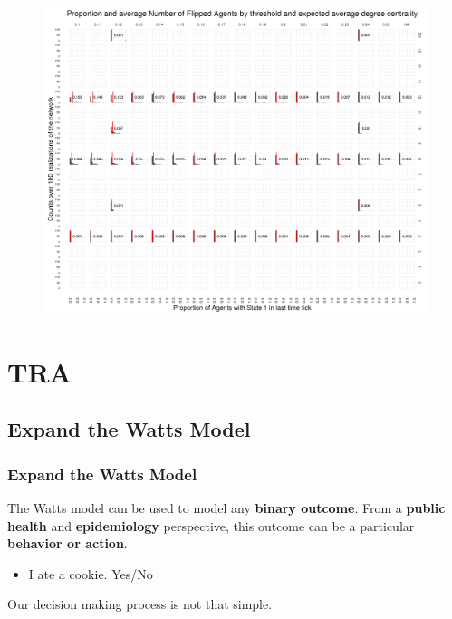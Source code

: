 \documentclass[compress]{beamer}
\begin{document}
    \begin{frame}[BlankLogo]
        \begin{figure}
            \centering
            \includegraphics[width=0.75\linewidth]{../figures/p_flipped_all}
            \caption{}
            \label{fig:pflippedall}
        \end{figure}
                    
    \end{frame}

\section{TRA}

\subsection{Expand the Watts Model}

    \begin{frame}[Basic2]\frametitle{Expand the Watts Model}
        The Watts model can be used to model any \textbf{binary outcome}.
        From a \textbf{public health} and \textbf{epidemiology} perspective,
        this outcome can be a particular \textbf{behavior or action}.
        \vspace{2mm}
        \begin{itemize}
            \item I ate a cookie.  Yes/No
        \end{itemize}
        
        \vspace{3mm}
        
        Our decision making process is not that simple.
    \end{frame}
\end{document}
